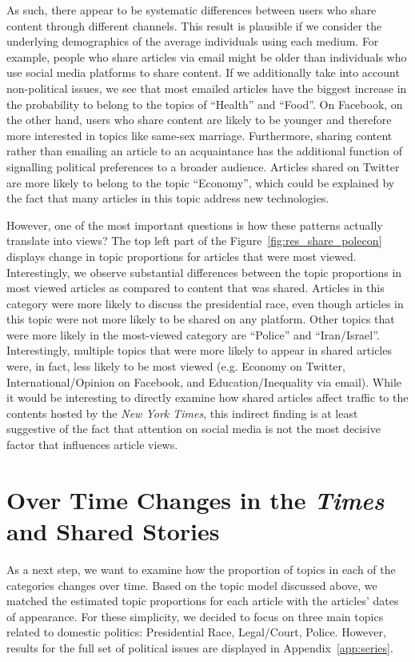 \documentclass[12pt]{article}
\begin{document}
\begin{doublespace}
As such, there appear to be systematic differences between users who share content through different channels. This result is plausible if we consider the underlying demographics of the average individuals using each medium. For example, people who share articles via email might be older than individuals who use social media platforms to share content. If we additionally take into account non-political issues, we see that most emailed articles have the biggest increase in the probability to belong to the topics of ``Health'' and ``Food''. On Facebook, on the other hand, users who share content are likely to be younger and therefore more interested in topics like same-sex marriage. Furthermore, sharing content rather than emailing an article to an acquaintance has the additional function of signalling political preferences to a broader audience. Articles shared on Twitter are more likely to belong to the topic ``Economy'', which could be explained by the fact that many articles in this topic address new technologies.

However, one of the most important questions is how these patterns actually translate into views? The top left part of the Figure~\ref{fig:res_share_polecon} displays change in topic proportions for articles that were most viewed. Interestingly, we observe substantial differences between the topic proportions in most viewed articles as compared to content that was shared. Articles in this category were more likely to discuss the presidential race, even though articles in this topic were not more likely to be shared on any platform. Other topics that were more likely in the most-viewed category are ``Police'' and ``Iran/Israel''. Interestingly, multiple topics that were more likely to appear in shared articles were, in fact, less likely to be most viewed (e.g. Economy on Twitter, International/Opinion on Facebook, and Education/Inequality via email). While it would be interesting to directly examine how shared articles affect traffic to the contents hosted by the \textit{New York Times}, this indirect finding is at least suggestive of the fact that attention on social media is not the most decisive factor that influences article views.


\section{Over Time Changes in the \textit{Times} and Shared Stories}
As a next step, we want to examine how the proportion of topics in each of the categories changes over time. Based on the topic model discussed above, we matched the estimated topic proportions for each article with the articles' dates of appearance. For these simplicity, we decided to focus on three main topics related to domestic politics: Presidential Race, Legal/Court, Police. However, results for the full set of political issues are displayed in Appendix~\ref{app:series}.


\end{doublespace}
\end{document}
